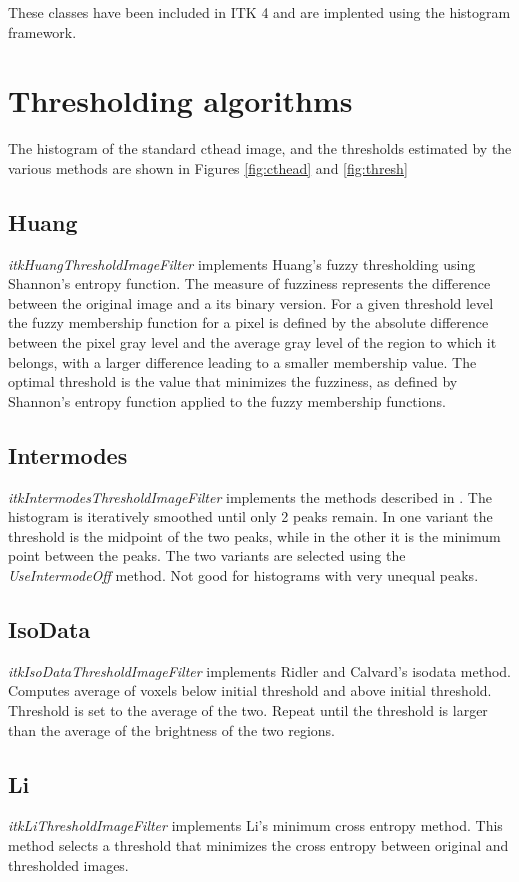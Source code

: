 \documentclass{InsightArticle}
\begin{document}
These classes have been included in ITK 4 and are implented using the
histogram framework.

\section{Thresholding algorithms}
The histogram of the standard cthead image, and the thresholds
estimated by the various methods are shown in Figures \ref{fig:cthead}
and \ref{fig:thresh}
\subsection{Huang}
{\em itkHuangThresholdImageFilter} implements Huang's fuzzy
thresholding using Shannon's entropy
function\cite{huang1995image}. The measure of fuzziness represents the
difference between the original image and a its binary version. For a
given threshold level the fuzzy membership function for a pixel is defined by the
absolute difference between the pixel gray level and the average gray
level of the region to which it belongs, with a larger difference
leading to a smaller membership value. The optimal threshold is
the value that minimizes the fuzziness, as defined by Shannon's
entropy function applied to the fuzzy membership functions.

\subsection{Intermodes}
{\em itkIntermodesThresholdImageFilter} implements the methods
described in \cite{prewitt1965analysis}. The histogram is iteratively
smoothed until only 2 peaks remain. In one variant the threshold is
the midpoint of the two peaks, while in the other it is the minimum
point between the peaks. The two variants are selected using the {\em
  UseIntermodeOff} method. Not good for histograms with very unequal
peaks.
\subsection{IsoData}
{\em itkIsoDataThresholdImageFilter} implements Ridler and Calvard's
\cite{ridler1978picture} isodata method. 
Computes average of voxels below initial threshold and above initial
threshold. Threshold is set to the average of the two. Repeat until
the threshold is larger than the average of the brightness of the two regions.

\subsection{Li}
 {\em itkLiThresholdImageFilter} implements Li's minimum cross entropy
 method\cite{li1993minimum,li1998iterative}. This method selects a
 threshold that minimizes the cross entropy between original and
 thresholded images.
\end{document}

